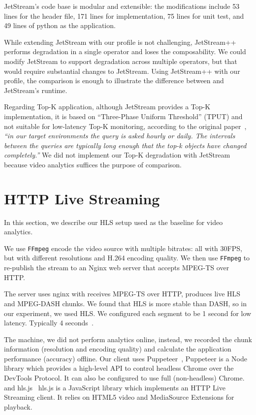 \documentclass[twocolumn, 9pt]{article}
\begin{document}
JetStream's code base is modular and extensible: the modifications include 53
lines for the header file, 171 lines for implementation, 75 lines for unit test,
and 49 lines of python as the application.

While extending JetStream with our profile is not challenging, JetStream++
performs degradation in a single operator and loses the composability. We could
modify JetStream to support degradation across multiple operators, but that
would require substantial changes to JetStream. Using JetStream++ with our
profile, the comparison is enough to illustrate the difference between
\sysname{} and JetStream's runtime.

Regarding Top-K application, although JetStream provides a Top-K implementation,
it is based on ``Three-Phase Uniform Threshold'' (TPUT) and not suitable for
low-latency Top-K monitoring, according to the original
paper~\cite{cao2004efficient}, \textit{``in our target environments the query is
  asked hourly or daily. The intervals between the queries are typically long
  enough that the top-k objects have changed completely.''} We did not implement
our Top-K degradation with JetStream because video analytics suffices the
purpose of comparison.


\section{HTTP Live Streaming}
\label{appendix:hls}

In this section, we describe our HLS setup used as the baseline for video
analytics.

 We use \texttt{FFmpeg} encode the video source with
multiple bitrates: all with 30FPS, but with different resolutions and H.264
encoding quality. We then use \texttt{FFmpeg} to re-publish the stream to an
Nginx web server that accepts MPEG-TS over HTTP.

 The server uses nginx with \cite{nginx-ts-module} receives
MPEG-TS over HTTP, produces live HLS and MPEG-DASH chunks. We found that HLS is
more stable than DASH, so in our experiment, we used HLS. We configured each
segment to be 1 second for low latency. Typically 4 seconds~\cite{mao2017neural,
  sun2016cs2p, wang2016anatomy}.

 The machine, we did not perform analytics online, instead, we
recorded the chunk information (resolution and encoding quality) and calculate
the application performance (accuracy) offline. Our client uses
Puppeteer~\cite{puppeteer}, Puppeteer is a Node library which provides a
high-level API to control headless Chrome over the DevTools Protocol. It can
also be configured to use full (non-headless) Chrome. and hls.js~\cite{hls.js}
hls.js is a JavaScript library which implements an HTTP Live Streaming
client. It relies on HTML5 video and MediaSource Extensions for playback.

{\footnotesize 
  }
\end{document}
